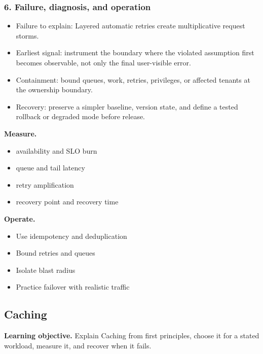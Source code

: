 \subsubsection*{6. Failure, diagnosis, and operation}
\begin{itemize}
\item Failure to explain: Layered automatic retries create multiplicative request storms.
\item Earliest signal: instrument the boundary where the violated assumption first becomes observable, not only the final user-visible error.
\item Containment: bound queues, work, retries, privileges, or affected tenants at the ownership boundary.
\item Recovery: preserve a simpler baseline, version state, and define a tested rollback or degraded mode before release.
\end{itemize}
\textbf{Measure.}\begin{itemize}
\item availability and SLO burn
\item queue and tail latency
\item retry amplification
\item recovery point and recovery time
\end{itemize}
\textbf{Operate.}\begin{itemize}
\item Use idempotency and deduplication
\item Bound retries and queues
\item Isolate blast radius
\item Practice failover with realistic traffic
\end{itemize}
\subsection{Caching}
\textbf{Learning objective.} Explain Caching from first principles, choose it for a stated workload, measure it, and recover when it fails.
